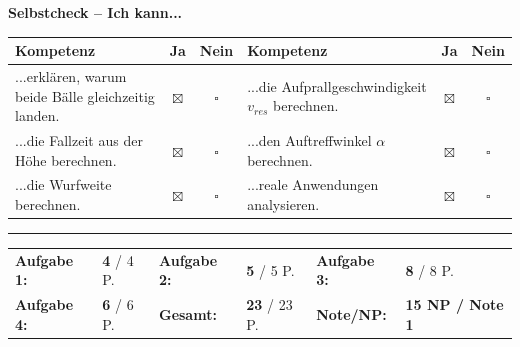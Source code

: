 \documentclass[10pt, a4paper]{article}
\newcommand{\lsg}[1]{\textcolor{loesung}{\textbf{#1}}}
\begin{document}
\small
\textbf{Selbstcheck -- Ich kann...}

\begin{tabular}{|p{6cm}|c|c||p{6cm}|c|c|}
\hline
\textbf{Kompetenz} & \textbf{Ja} & \textbf{Nein} & \textbf{Kompetenz} & \textbf{Ja} & \textbf{Nein} \\
\hline
...erklären, warum beide Bälle gleichzeitig landen. & \lsg{$\boxtimes$} & $\square$ &
...die Aufprallgeschwindigkeit $v_{res}$ berechnen. & \lsg{$\boxtimes$} & $\square$ \\
\hline
...die Fallzeit aus der Höhe berechnen. & \lsg{$\boxtimes$} & $\square$ &
...den Auftreffwinkel $\alpha$ berechnen. & \lsg{$\boxtimes$} & $\square$ \\
\hline
...die Wurfweite berechnen. & \lsg{$\boxtimes$} & $\square$ &
...reale Anwendungen analysieren. & \lsg{$\boxtimes$} & $\square$ \\
\hline
\end{tabular}


\vfill
\hrule
\vspace{4pt}
\small
\begin{tabular}{llllll}
\textbf{Aufgabe 1:} & \lsg{4} / 4 P. &
\textbf{Aufgabe 2:} & \lsg{5} / 5 P. &
\textbf{Aufgabe 3:} & \lsg{8} / 8 P. \\[4pt]
\textbf{Aufgabe 4:} & \lsg{6} / 6 P. &
\textbf{Gesamt:} & \lsg{23} / 23 P. &
\textbf{Note/NP:} & \lsg{15 NP / Note 1}
\end{tabular}
\end{document}
